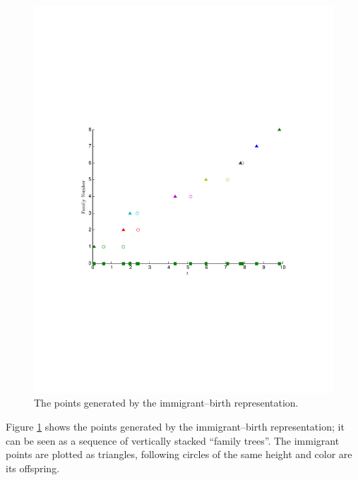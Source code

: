 \begin{figure}[H]
	\centering
	\includegraphics[trim = 0.8cm 8.5cm 0.8cm 8cm,clip,width=1.00\textwidth ]{Hawkess_ClusterFamily.pdf}
	\caption{The points generated by the immigrant–birth representation.}
	\label{Example_ClusterFamily}
\end{figure}
Figure \ref{Example_ClusterFamily} shows the
points generated by the immigrant–birth representation; it can be seen as a sequence
of vertically stacked “family trees”. The immigrant points are plotted as triangles, following circles of the same height and color are its offspring.
